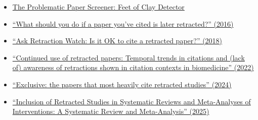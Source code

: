 \documentclass[letterpaper, 12pt]{article}
\begin{document}
\begin{itemize}
    \setlength\itemsep{-0.5em}
    \item \href{https://www.irit.fr/~Guillaume.Cabanac/problematic-paper-screener/feet-of-clay}{The Problematic Paper Screener: Feet of Clay Detector}
    \item \href{https://retractionwatch.com/2016/11/01/what-should-you-do-if-a-paper-youve-cited-is-later-retracted/}{``What should you do if a paper you’ve cited is later retracted?'' (2016)}
    \item \href{https://retractionwatch.com/2018/01/05/ask-retraction-watch-ok-cite-retracted-paper/}{``Ask Retraction Watch: Is it OK to cite a retracted paper?'' (2018)}
    \item \href{https://doi.org/10.1162/qss_a_00155}{``Continued use of retracted papers: Temporal trends in citations and (lack of) awareness of retractions shown in citation contexts in biomedicine'' (2022)}
    \item \href{https://doi.org/10.1378/chest.11-0523}{``Exclusive: the papers that most heavily cite retracted studies'' (2024)}
    \item \href{https://doi.org/10.1001/jamainternmed.2025.0256}{``Inclusion of Retracted Studies in Systematic Reviews and Meta-Analyses of Interventions: A Systematic Review and Meta-Analysis'' (2025)}
\end{itemize}
\end{document}
